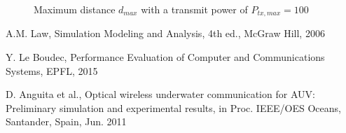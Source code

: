 \documentclass[10pt]{article}
\begin{document}
\begin{figure}[h!]
	\centering
	\caption{Maximum distance $d_{max}$ with a transmit power of $P_{tx, max} = 100$}
	\label{fig:dmax}
\end{figure}


\begin{thebibliography}{10}

A.M. Law, Simulation Modeling and Analysis, 4th ed., McGraw Hill, 2006

Y. Le Boudec, Performance Evaluation of Computer and Communications Systems, EPFL, 2015

D. Anguita et al., Optical wireless underwater communication for AUV: Preliminary simulation and experimental results, in Proc. IEEE/OES Oceans, Santander, Spain, Jun. 2011

\end{thebibliography}
\end{document}
